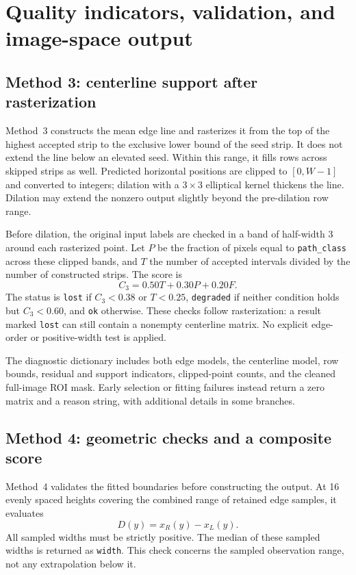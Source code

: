 \section{Quality indicators, validation, and image-space output}
\label{sec:c4_output}

\subsection{Method 3: centerline support after rasterization}
\label{subsec:c4_output3}

Method~3 constructs the mean edge line and rasterizes it from the top
of the highest accepted strip to the exclusive lower bound of the seed
strip. It does not extend the line below an elevated seed. Within this
range, it fills rows across skipped strips as well. Predicted horizontal
positions are clipped to $[0,W-1]$ and converted to integers; dilation
with a $3\times3$ elliptical kernel thickens the line. Dilation may extend
the nonzero output slightly beyond the pre-dilation row range.

Before dilation, the original input labels are checked in a band of
half-width 3 around each rasterized point. Let $P$ be the fraction of
pixels equal to \texttt{path\_class} across these clipped bands, and
$T$ the number of accepted intervals divided by the number of constructed
strips. The score is
\begin{equation}
    C_3=0.50T+0.30P+0.20F.
    \label{eq:c4_confidence3}
\end{equation}
The status is \texttt{lost} if $C_3<0.38$ or $T<0.25$,
\texttt{degraded} if neither condition holds but $C_3<0.60$, and
\texttt{ok} otherwise. These checks follow rasterization: a result marked
\texttt{lost} can still contain a nonempty centerline matrix. No explicit
edge-order or positive-width test is applied.

The diagnostic dictionary includes both edge models, the centerline
model, row bounds, residual and support indicators, clipped-point counts,
and the cleaned full-image ROI mask. Early selection or fitting failures
instead return a zero matrix and a reason string, with additional details
in some branches.

\subsection{Method 4: geometric checks and a composite score}
\label{subsec:c4_output4}

Method~4 validates the fitted boundaries before constructing the output.
At 16 evenly spaced heights covering the combined range of retained
edge samples, it evaluates
\begin{equation}
    D(y)=x_R(y)-x_L(y).
\end{equation}
All sampled widths must be strictly positive. The median of these
sampled widths is returned as \texttt{width}. This check concerns the
sampled observation range, not any extrapolation below it.

